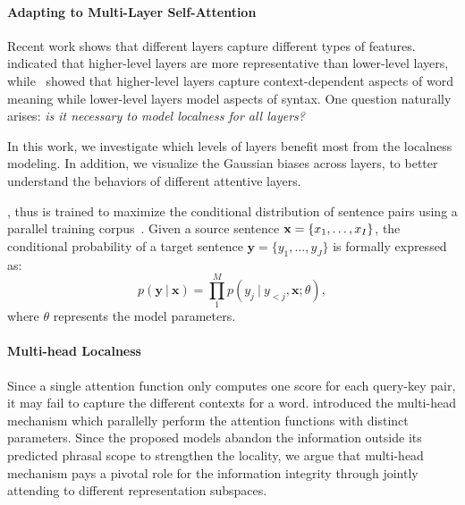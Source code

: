 \documentclass[11pt,a4paper]{article}
\begin{document}
\paragraph{Adapting to Multi-Layer Self-Attention}
Recent work shows that different layers capture different types of features.
~ indicated that higher-level layers are more representative than lower-level layers, while~ showed that higher-level layers capture context-dependent aspects of word meaning while lower-level layers model aspects of syntax. 
One question naturally arises: {\em is it necessary to model localness for all layers?}

In this work, we investigate which levels of layers benefit most from the localness modeling. In addition, we visualize the Gaussian biases across layers, to better understand the behaviors of different attentive layers.



\iffalse
, thus is trained to maximize the conditional distribution of sentence pairs using {a} parallel training corpus~\cite{kalchbrenner2013recurrent,sutskever2014sequence,cho2014learning,cho2014properties}. Given a source sentence  ${\bf x}=\{x_1, \dots, x_I\}$, the conditional probability of a target sentence  $\textbf{y}=\{y_1, \dots, y_J\}$ is formally expressed as:
 \begin{equation*}
  p(\textbf{y}\ |\ \textbf{x}) = \prod_{1}^{M}p(y_j\ |\  {y_{<j}},\textbf{x};\theta ), 
  \end{equation*} 
 where $\theta$ represents the model parameters. 

 








\paragraph{Multi-head Localness}  Since a single attention function only computes one score for each query-key pair, it may fail to capture the different contexts for a word.  introduced the multi-head mechanism which parallelly perform the attention functions with distinct parameters. Since the proposed models abandon the information outside its predicted phrasal scope to strengthen the locality, we argue that multi-head mechanism pays a pivotal role for the information integrity through jointly attending to different representation subspaces.  
\end{document}
